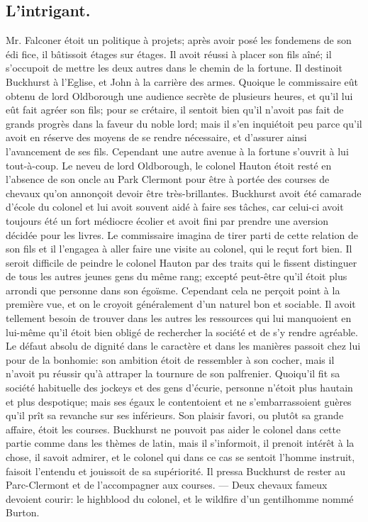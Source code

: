 \subsection{L'intrigant.}
Mr. Falconer étoit un politique à projets; après avoir posé les fondemens de son édi fice, il bâtissoit étages sur étages. Il avoit réussi à placer son fils aîné; il s'occupoit de mettre les deux autres dans le chemin de la fortune. Il destinoit Buckhurst à l'Eglise, et John à la carrière des armes. Quoique le commissaire eût obtenu de lord Oldborough une audience secrète de plusieurs heures, et qu'il lui eût fait agréer son fils; pour se\setcounter{page}{519} crétaire, il sentoit bien qu'il n'avoit pas fait de grands progrès dans la faveur du noble lord; mais il s'en inquiétoit peu parce qu'il avoit en réserve des moyens de se rendre nécessaire, et d'assurer ainsi l'avancement de ses fils.
Cependant une autre avenue à la fortune s'ouvrit à lui tout-à-coup. Le neveu de lord Oldborough, le colonel Hauton étoit resté en l'absence de son oncle au Park Clermont pour être à portée des courses de chevaux qu'on annonçoit devoir être très-brillantes. Buckhurst avoit été camarade d'école du colonel et lui avoit souvent aidé à faire ses tâches, car celui-ci avoit toujours été un fort médiocre écolier et avoit fini par prendre une aversion décidée pour les livres. Le commissaire imagina de tirer parti de cette relation de son fils et il l'engagea à aller faire une visite au colonel, qui le reçut fort bien.
Il seroit difficile de peindre le colonel Hauton par des traits qui le fissent distinguer de tous les autres jeunes gens du même rang; excepté peut-être qu'il étoit plus arrondi que personne dans son égoïsme. Cependant cela ne perçoit point à la première vue, et on le croyoit généralement d'un naturel bon et sociable. Il avoit tellement besoin de trouver dans les autres les ressources qui lui manquoient en lui-même qu'il étoit bien obligé\setcounter{page}{520} de rechercher la société et de s'y rendre agréable. Le défaut absolu de dignité dans le caractère et dans les manières passoit chez lui pour de la bonhomie: son ambition étoit de ressembler à son cocher, mais il n'avoit pu réussir qu'à attraper la tournure de son palfrenier.
Quoiqu'il fit sa société habituelle des jockeys et des gens d'écurie, personne n'étoit plus hautain et plus despotique; mais ses égaux le contentoient et ne s'embarrassoient guères qu'il prît sa revanche sur ses inférieurs.
Son plaisir favori, ou plutôt sa grande affaire, étoit les courses. Buckhurst ne pouvoit pas aider le colonel dans cette partie comme dans les thèmes de latin, mais il s'informoit, il prenoit intérêt à la chose, il savoit admirer, et le colonel qui dans ce cas se sentoit l'homme instruit, faisoit l'entendu et jouissoit de sa supériorité. Il pressa Buckhurst de rester au Parc-Clermont et de l'accompagner aux courses. — Deux chevaux fameux devoient courir: le highblood du colonel, et le wildfire d'un gentilhomme nommé Burton.
